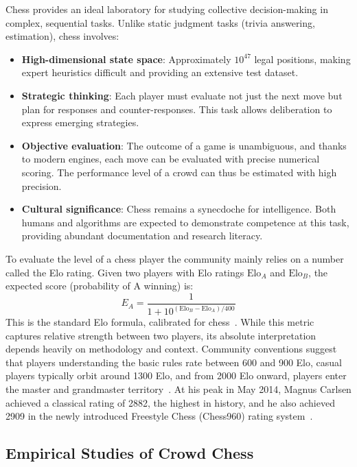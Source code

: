 \documentclass{article}
\begin{document}
Chess provides an ideal laboratory for studying collective decision-making in complex, sequential tasks.
Unlike static judgment tasks (trivia answering, estimation), chess involves:
\begin{itemize}
  \item \textbf{High-dimensional state space}: Approximately \(10^{47}\) legal positions, making expert heuristics difficult and providing an extensive test dataset.
  \item \textbf{Strategic thinking}: Each player must evaluate not just the next move but plan for responses and counter-responses. This task allows deliberation to express emerging strategies.
  \item \textbf{Objective evaluation}: The outcome of a game is unambiguous, and thanks to modern engines, each move can be evaluated with precise numerical scoring. The performance level of a crowd can thus be estimated with high precision.
  \item \textbf{Cultural significance}: Chess remains a synecdoche for intelligence. Both humans and algorithms are expected to demonstrate competence at this task, providing abundant documentation and research literacy.
\end{itemize}

To evaluate the level of a chess player the community mainly relies on a number called the Elo rating.
Given two players with Elo ratings \(\text{Elo}_A\) and \(\text{Elo}_B\), the expected score (probability of A winning) is:
\begin{equation} \label{eqn:elo}
  E_A = \frac{1}{1 + 10^{(\text{Elo}_B - \text{Elo}_A) / 400}}
\end{equation}
This is the standard Elo formula, calibrated for chess~\cite{elo1978}.
While this metric captures relative strength between two players, its absolute interpretation depends heavily on methodology and context.
Community conventions suggest that players understanding the basic rules rate between 600 and 900 Elo, casual players typically orbit around 1300 Elo, and from 2000 Elo onward, players enter the master and grandmaster territory~\cite{elo1978}.
At his peak in May 2014, Magnus Carlsen achieved a classical rating of 2882, the highest in history, and he also achieved 2909 in the newly introduced Freestyle Chess (Chess960) rating system~\cite{carlsen2025}.

\subsection{Empirical Studies of Crowd Chess}
\end{document}
